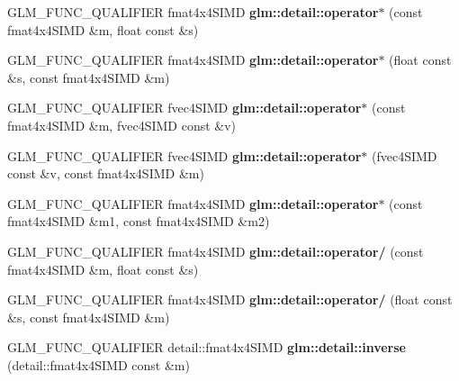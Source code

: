 \begin{DoxyCompactItemize}
\item 
\mbox{\label{simd__mat4_8inl_a56fc3932025be61fb9a7cb14005c0d00}} 
G\+L\+M\+\_\+\+F\+U\+N\+C\+\_\+\+Q\+U\+A\+L\+I\+F\+I\+ER fmat4x4\+S\+I\+MD {\bfseries glm\+::detail\+::operator$\ast$} (const fmat4x4\+S\+I\+MD \&m, float const \&s)
\item 
\mbox{\label{simd__mat4_8inl_a8ab387a0948c211143bbb41dd8fda30c}} 
G\+L\+M\+\_\+\+F\+U\+N\+C\+\_\+\+Q\+U\+A\+L\+I\+F\+I\+ER fmat4x4\+S\+I\+MD {\bfseries glm\+::detail\+::operator$\ast$} (float const \&s, const fmat4x4\+S\+I\+MD \&m)
\item 
\mbox{\label{simd__mat4_8inl_a8ba6a9d268faa4277d6734a2da036c4d}} 
G\+L\+M\+\_\+\+F\+U\+N\+C\+\_\+\+Q\+U\+A\+L\+I\+F\+I\+ER fvec4\+S\+I\+MD {\bfseries glm\+::detail\+::operator$\ast$} (const fmat4x4\+S\+I\+MD \&m, fvec4\+S\+I\+MD const \&v)
\item 
\mbox{\label{simd__mat4_8inl_a0f6596e928f7dc3fb62a38bb5df08d18}} 
G\+L\+M\+\_\+\+F\+U\+N\+C\+\_\+\+Q\+U\+A\+L\+I\+F\+I\+ER fvec4\+S\+I\+MD {\bfseries glm\+::detail\+::operator$\ast$} (fvec4\+S\+I\+MD const \&v, const fmat4x4\+S\+I\+MD \&m)
\item 
\mbox{\label{simd__mat4_8inl_a628d3f0d2c16d6207ca18a11ad66261c}} 
G\+L\+M\+\_\+\+F\+U\+N\+C\+\_\+\+Q\+U\+A\+L\+I\+F\+I\+ER fmat4x4\+S\+I\+MD {\bfseries glm\+::detail\+::operator$\ast$} (const fmat4x4\+S\+I\+MD \&m1, const fmat4x4\+S\+I\+MD \&m2)
\item 
\mbox{\label{simd__mat4_8inl_aa8f3ac302faac4a9d5c0e49321ccf9cb}} 
G\+L\+M\+\_\+\+F\+U\+N\+C\+\_\+\+Q\+U\+A\+L\+I\+F\+I\+ER fmat4x4\+S\+I\+MD {\bfseries glm\+::detail\+::operator/} (const fmat4x4\+S\+I\+MD \&m, float const \&s)
\item 
\mbox{\label{simd__mat4_8inl_a33235564824caa327d104e227bc64045}} 
G\+L\+M\+\_\+\+F\+U\+N\+C\+\_\+\+Q\+U\+A\+L\+I\+F\+I\+ER fmat4x4\+S\+I\+MD {\bfseries glm\+::detail\+::operator/} (float const \&s, const fmat4x4\+S\+I\+MD \&m)
\item 
\mbox{\label{simd__mat4_8inl_a4d5c895b3548f6c8296fd6a9980fe3e1}} 
G\+L\+M\+\_\+\+F\+U\+N\+C\+\_\+\+Q\+U\+A\+L\+I\+F\+I\+ER detail\+::fmat4x4\+S\+I\+MD {\bfseries glm\+::detail\+::inverse} (detail\+::fmat4x4\+S\+I\+MD const \&m)

\end{DoxyCompactItemize}
